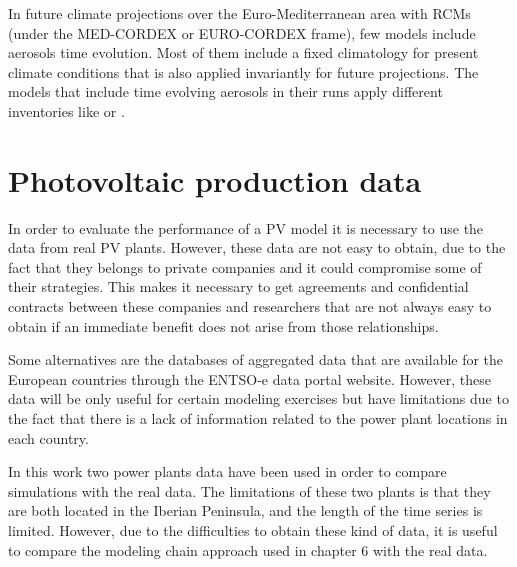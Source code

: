 In future climate projections over the Euro-Mediterranean area with RCMs (under the MED-CORDEX or EURO-CORDEX frame), few models include aerosols time evolution. Most of them include a fixed climatology for present climate conditions that is also applied invariantly for future projections. The models that include time evolving aerosols in their runs apply different inventories like \cite*{Szopa2013} or \cite*{Lamarque2010}.


\section{Photovoltaic production data}

In order to evaluate the performance of a PV model it is necessary to use the data from real PV plants. However, these data are not easy to obtain, due to the fact that they belongs to private companies and it could compromise some of their strategies. This makes it necessary to get agreements and confidential contracts between these companies and researchers that are not always easy to obtain if an immediate benefit does not arise from those relationships.

Some alternatives are the databases of aggregated data that are available for the European countries through the ENTSO-e data portal website. However, these data will be only useful for certain modeling exercises but have limitations due to the fact that there is a lack of information related to the power plant locations in each country.

In this work two power plants data have been used in order to compare simulations with the real data. The limitations of these two plants is that they are both located in the Iberian Peninsula, and the length of the time series is limited. However, due to the difficulties to obtain these kind of data, it is useful to compare the modeling chain approach used in chapter 6 with the real data.

\newpage

